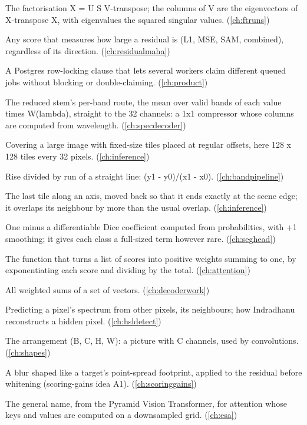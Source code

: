\begin{description}[style=nextline,leftmargin=1.2em,font=\normalfont\bfseries]
\item[Singular value decomposition] The factorisation X = U S V-transpose; the columns of V are the eigenvectors of X-transpose X, with eigenvalues the squared singular values. (\cref{ch:ftruns})
\item[Size score] Any score that measures how large a residual is (L1, MSE, SAM, combined), regardless of its direction. (\cref{ch:residualmaha})
\item[SKIP LOCKED] A Postgres row-locking clause that lets several workers claim different queued jobs without blocking or double-claiming. (\cref{ch:product})
\item[Skip path] The reduced stem's per-band route, the mean over valid bands of each value times W(lambda), straight to the 32 channels: a 1x1 compressor whose columns are computed from wavelength. (\cref{ch:specdecoder})
\item[Sliding window] Covering a large image with fixed-size tiles placed at regular offsets, here 128 x 128 tiles every 32 pixels. (\cref{ch:inference})
\item[Slope] Rise divided by run of a straight line: (y1 - y0)/(x1 - x0). (\cref{ch:bandpipeline})
\item[Snapped tile] The last tile along an axis, moved back so that it ends exactly at the scene edge; it overlaps its neighbour by more than the usual overlap. (\cref{ch:inference})
\item[Soft Dice loss] One minus a differentiable Dice coefficient computed from probabilities, with +1 smoothing; it gives each class a full-sized term however rare. (\cref{ch:seghead})
\item[Softmax] The function that turns a list of scores into positive weights summing to one, by exponentiating each score and dividing by the total. (\cref{ch:attention})
\item[Span] All weighted sums of a set of vectors. (\cref{ch:decoderwork})
\item[Spatial completion] Predicting a pixel's spectrum from other pixels, its neighbours; how Indradhanu reconstructs a hidden pixel. (\cref{ch:hsldetect})
\item[Spatial layout] The arrangement (B, C, H, W): a picture with C channels, used by convolutions. (\cref{ch:shapes})
\item[Spatial matched filter] A blur shaped like a target's point-spread footprint, applied to the residual before whitening (scoring-gains idea A1). (\cref{ch:scoringgains})
\item[Spatial-reduction attention] The general name, from the Pyramid Vision Transformer, for attention whose keys and values are computed on a downsampled grid. (\cref{ch:esa})

\end{description}

